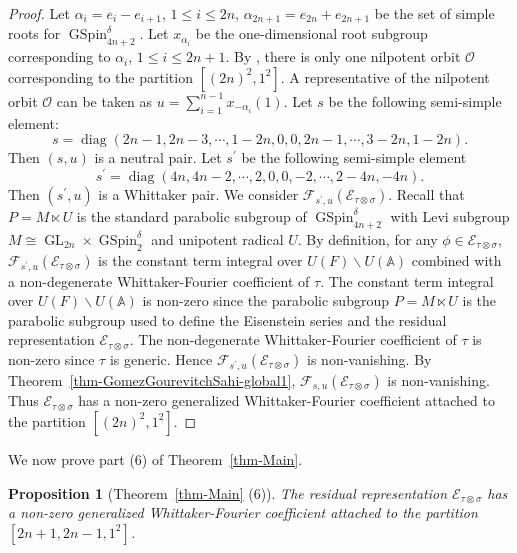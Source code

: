 \documentclass[12pt]{amsart}
\newcommand{\A}{\mathbb{A}}
\newcommand{\CE}{{\mathcal{E}}}
\newtheorem{proposition}[theorem]{Proposition}%
\theoremstyle{remark}
\DeclareMathOperator{\diag}{diag}
\DeclareMathOperator{\GL}{GL}
\DeclareMathOperator{\GSpin}{GSpin}
\begin{document}
\begin{proof}
Let $\alpha_i=e_i-e_{i+1}$, $1\le i \le 2n$, $\alpha_{2n+1}=e_{2n}+e_{2n+1}$ be the set of simple roots for $\GSpin_{4n+2}^\delta$. Let $x_{\alpha_i}$ be the one-dimensional root subgroup corresponding to $\alpha_i$, $1\le i \le 2n+1$. By \cite[\S I.6]{Waldspurger2001Nilpotent}, there is only one nilpotent orbit $\mathcal{O}$ corresponding to the partition $[(2n)^2,1^2]$. A representative of the nilpotent orbit $\mathcal{O}$ can be taken as $u=\sum_{i=1}^{n-1}x_{-\alpha_i}(1)$. Let $s$ be the following semi-simple element:
\begin{equation*}
s=\diag( 2n-1, 2n-3, \cdots, 1-2n, 0, 0, 2n-1, \cdots, 3-2n,1-2n).
\end{equation*}
Then $(s,u)$ is a neutral pair. Let $s^\prime$ be the following semi-simple element
\begin{equation*}
s^\prime=\diag( 4n, 4n-2, \cdots, 2, 0, 0, -2, \cdots, 2-4n, -4n).	
\end{equation*}
Then $(s^\prime, u)$ is a Whittaker pair. We consider $\mathcal{F}_{s^\prime, u}(\CE_{\tau \otimes \sigma})$. Recall that $P=M\ltimes U$ is the standard parabolic subgroup of $\GSpin_{4n+2}^\delta$ with Levi subgroup $M\cong \GL_{2n}\times \GSpin_{2}^\delta$ and unipotent radical $U$. By definition, for any $\phi\in \CE_{\tau \otimes \sigma}$, $\mathcal{F}_{s^\prime, u}(\CE_{\tau \otimes \sigma})$ is the constant term integral over $U(F)\backslash U(\A)$ combined with a non-degenerate Whittaker-Fourier coefficient of $\tau$. 
The constant term integral over $U(F)\backslash U(\A)$ is non-zero since the parabolic subgroup $P=M\ltimes U$ is the parabolic subgroup used to define the Eisenstein series and the residual representation $\CE_{\tau \otimes \sigma}$. 
The non-degenerate Whittaker-Fourier coefficient of $\tau$ is non-zero since $\tau$ is generic. 
Hence $\mathcal{F}_{s^\prime, u}(\CE_{\tau \otimes \sigma})$ is non-vanishing. By Theorem~\ref{thm-GomezGourevitchSahi-global1}, $\mathcal{F}_{s, u}(\CE_{\tau \otimes \sigma})$ is non-vanishing. Thus $\CE_{\tau \otimes \sigma}$ has a non-zero generalized Whittaker-Fourier coefficient attached to the partition $[(2n)^2,1^2]$. 
\end{proof}

We now prove part (6) of Theorem~\ref{thm-Main}.
\begin{proposition}[Theorem~\ref{thm-Main} (6)]
\label{prop-nonvanishing-toporbitraise}
The residual representation $\CE_{\tau \otimes \sigma}$ has a non-zero generalized Whittaker-Fourier coefficient attached to the partition $[2n+1,2n-1, 1^2]$.
\end{proposition}
\end{document}

